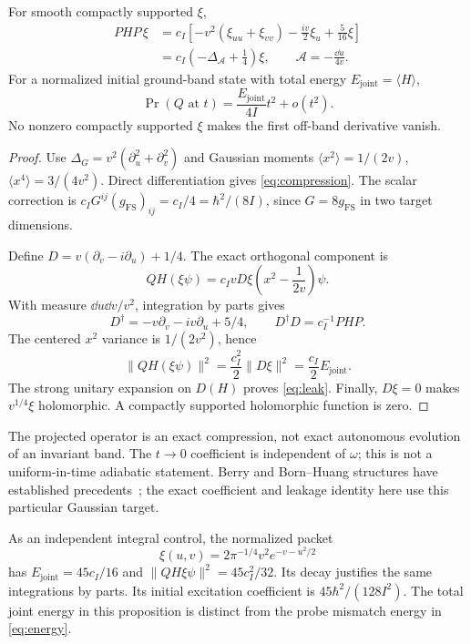 \documentclass[11pt]{article}
\begin{document}
\begin{proposition}\label{prop:leak}
For smooth compactly supported $\xi$,
\begin{align}
PHP\,\xi&=c_I\left[-v^2(\xi_{uu}+\xi_{vv})-\frac{iv}{2}\xi_u+\frac5{16}\xi\right]\label{eq:compression}\\
&=c_I\left(-\Delta_{\mathcal A}+\tfrac14\right)\xi,
\qquad \mathcal A=-\frac{\dd u}{4v}.
\end{align}
For a normalized initial ground-band state with total energy $E_{\mathrm{joint}}=\langle H\rangle$,
\begin{equation}\label{eq:leak}
\boxed{\Pr(Q\text{ at }t)=\frac{E_{\mathrm{joint}}}{4I}t^2+o(t^2).}
\end{equation}
No nonzero compactly supported $\xi$ makes the first off-band derivative vanish.
\end{proposition}
\begin{proof}
Use $\Delta_G=v^2(\partial_u^2+\partial_v^2)$ and Gaussian moments $\langle x^2\rangle=1/(2v)$, $\langle x^4\rangle=3/(4v^2)$. Direct differentiation gives \eqref{eq:compression}. The scalar correction is $c_I G^{ij}(g_{\mathrm{FS}})_{ij}=c_I/4=\hbar^2/(8I)$, since $G=8g_{\mathrm{FS}}$ in two target dimensions.

Define $D=v(\partial_v-i\partial_u)+1/4$. The exact orthogonal component is
\[
QH(\xi\psi)=c_I vD\xi\left(x^2-\frac1{2v}\right)\psi.
\]
With measure $\dd u\dd v/v^2$, integration by parts gives
\[
D^\dagger=-v\partial_v-iv\partial_u+5/4,
\qquad D^\dagger D=c_I^{-1}PHP.
\]
The centered $x^2$ variance is $1/(2v^2)$, hence
\[
\|QH(\xi\psi)\|^2=\frac{c_I^2}{2}\|D\xi\|^2
=\frac{c_I}{2}E_{\mathrm{joint}}.
\]
The strong unitary expansion on $D(H)$ proves \eqref{eq:leak}. Finally, $D\xi=0$ makes $v^{1/4}\xi$ holomorphic. A compactly supported holomorphic function is zero.
\end{proof}

The projected operator is an exact compression, not exact autonomous evolution of an invariant band. The $t\to0$ coefficient is independent of $\omega$; this is not a uniform-in-time adiabatic statement. Berry and Born--Huang structures have established precedents~\cite{Garcia,Wiggins}; the exact coefficient and leakage identity here use this particular Gaussian target.

As an independent integral control, the normalized packet
\[
\xi(u,v)=2\pi^{-1/4}v^2e^{-v-u^2/2}
\]
has $E_{\mathrm{joint}}=45c_I/16$ and $\|QH\xi\psi\|^2=45c_I^2/32$. Its decay justifies the same integrations by parts. Its initial excitation coefficient is $45\hbar^2/(128I^2)$. The total joint energy in this proposition is distinct from the probe mismatch energy in \eqref{eq:energy}.
\end{document}
